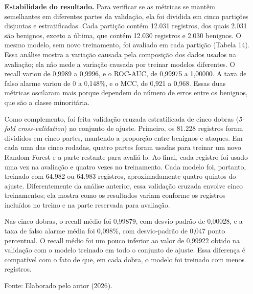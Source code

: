 \documentclass[
    12pt,                %
    openright,           %
    oneside,             %
    a4paper,             %
    english,             %
    brazil               %
]{abntex2}
\begin{document}
\textbf{Estabilidade do resultado.} Para verificar se as métricas se mantêm semelhantes em diferentes partes da validação, ela foi dividida em cinco partições disjuntas e estratificadas. Cada partição contém 12.031 registros, dos quais 2.031 são benignos, exceto a última, que contém 12.030 registros e 2.030 benignos. O mesmo modelo, sem novo treinamento, foi avaliado em cada partição (Tabela 14). Essa análise mostra a variação causada pela composição dos dados usados na avaliação; ela não mede a variação causada por treinar modelos diferentes. O recall variou de 0,9989 a 0,9996, e o ROC-AUC, de 0,99975 a 1,00000. A taxa de falso alarme variou de 0 a 0,148\%, e o MCC, de 0,921 a 0,968. Essas duas métricas oscilaram mais porque dependem do número de erros entre os benignos, que são a classe minoritária.

Como complemento, foi feita validação cruzada estratificada de cinco dobras (\textit{5-fold cross-validation}) no conjunto de ajuste. Primeiro, os 81.228 registros foram divididos em cinco partes, mantendo a proporção entre benignos e ataques. Em cada uma das cinco rodadas, quatro partes foram usadas para treinar um novo Random Forest e a parte restante para avaliá-lo. Ao final, cada registro foi usado uma vez na avaliação e quatro vezes no treinamento. Cada modelo foi, portanto, treinado com 64.982 ou 64.983 registros, aproximadamente quatro quintos do ajuste. Diferentemente da análise anterior, essa validação cruzada envolve cinco treinamentos; ela mostra como os resultados variam conforme os registros incluídos no treino e na parte reservada para avaliação.

Nas cinco dobras, o recall médio foi 0,99879, com desvio-padrão de 0,00028, e a taxa de falso alarme média foi 0,098\%, com desvio-padrão de 0,047 ponto percentual. O recall médio foi um pouco inferior ao valor de 0,99922 obtido na validação com o modelo treinado em todo o conjunto de ajuste. Essa diferença é compatível com o fato de que, em cada dobra, o modelo foi treinado com menos registros.

\begin{table}
\centering
\caption{Dispersão das métricas (média $\pm$ desvio-padrão; mín--máx)}
\label{tab:dispersao-metricas-rf}
\par\smallskip
Fonte: Elaborado pelo autor (2026).
\end{table}
\end{document}
